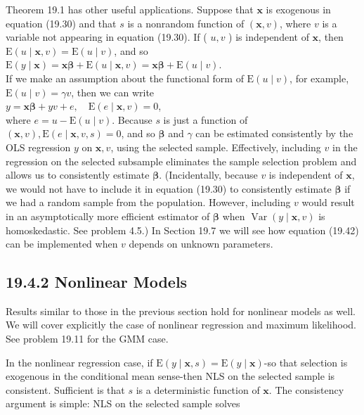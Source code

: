 \documentclass[10pt]{article}
\begin{document}
Theorem 19.1 has other useful applications. Suppose that $\mathbf{x}$ is exogenous in equation (19.30) and that $s$ is a nonrandom function of $(\mathbf{x}, v)$, where $v$ is a variable not appearing in equation (19.30). If ( $u, v$ ) is independent of $\mathbf{x}$, then $\mathrm{E}(u \mid \mathbf{x}, v)=\mathrm{E}(u \mid v)$, and so\\
$\mathrm{E}(y \mid \mathbf{x})=\mathbf{x} \boldsymbol{\beta}+\mathrm{E}(u \mid \mathbf{x}, v)=\mathbf{x} \boldsymbol{\beta}+\mathrm{E}(u \mid v)$.\\
If we make an assumption about the functional form of $\mathrm{E}(u \mid v)$, for example, $\mathrm{E}(u \mid v)=\gamma v$, then we can write\\
$y=\mathbf{x} \boldsymbol{\beta}+y v+e, \quad \mathrm{E}(e \mid \mathbf{x}, v)=0$,\\
where $e=u-\mathrm{E}(u \mid v)$. Because $s$ is just a function of $(\mathbf{x}, v), \mathrm{E}(e \mid \mathbf{x}, v, s)=0$, and so $\boldsymbol{\beta}$ and $\gamma$ can be estimated consistently by the OLS regression $y$ on $\mathbf{x}, v$, using the selected sample. Effectively, including $v$ in the regression on the selected subsample eliminates the sample selection problem and allows us to consistently estimate $\boldsymbol{\beta}$. (Incidentally, because $v$ is independent of $\mathbf{x}$, we would not have to include it in equation (19.30) to consistently estimate $\boldsymbol{\beta}$ if we had a random sample from the population. However, including $v$ would result in an asymptotically more efficient estimator of $\boldsymbol{\beta}$ when $\operatorname{Var}(y \mid \mathbf{x}, v)$ is homoskedastic. See problem 4.5.) In Section 19.7 we will see how equation (19.42) can be implemented when $v$ depends on unknown parameters.

\subsection*{19.4.2 Nonlinear Models}
Results similar to those in the previous section hold for nonlinear models as well. We will cover explicitly the case of nonlinear regression and maximum likelihood. See problem 19.11 for the GMM case.

In the nonlinear regression case, if $\mathrm{E}(y \mid \mathbf{x}, s)=\mathrm{E}(y \mid \mathbf{x})$-so that selection is exogenous in the conditional mean sense-then NLS on the selected sample is consistent. Sufficient is that $s$ is a deterministic function of $\mathbf{x}$. The consistency argument is simple: NLS on the selected sample solves
\end{document}
